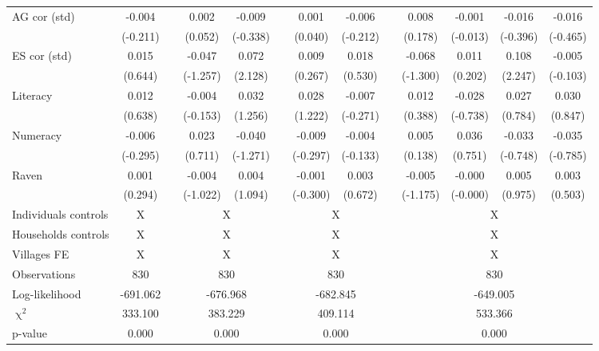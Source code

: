 \begin{table}[htbp]
{\begin{tabular}{lcccccccccccc}
    AG cor (std) & -0.004 &       & 0.002 & -0.009 &       & 0.001 & -0.006 &       & 0.008 & -0.001 & -0.016 & -0.016 \\
          & (-0.211) &       & (0.052) & (-0.338) &       & (0.040) & (-0.212) &       & (0.178) & (-0.013) & (-0.396) & (-0.465) \\
    ES cor (std) & 0.015 &       & -0.047 & 0.072 &       & 0.009 & 0.018 &       & -0.068 & 0.011 & 0.108 & -0.005 \\
          & (0.644) &       & (-1.257) & (2.128) &       & (0.267) & (0.530) &       & (-1.300) & (0.202) & (2.247) & (-0.103) \\
    Literacy & 0.012 &       & -0.004 & 0.032 &       & 0.028 & -0.007 &       & 0.012 & -0.028 & 0.027 & 0.030 \\
          & (0.638) &       & (-0.153) & (1.256) &       & (1.222) & (-0.271) &       & (0.388) & (-0.738) & (0.784) & (0.847) \\
    Numeracy & -0.006 &       & 0.023 & -0.040 &       & -0.009 & -0.004 &       & 0.005 & 0.036 & -0.033 & -0.035 \\
          & (-0.295) &       & (0.711) & (-1.271) &       & (-0.297) & (-0.133) &       & (0.138) & (0.751) & (-0.748) & (-0.785) \\
    Raven & 0.001 &       & -0.004 & 0.004 &       & -0.001 & 0.003 &       & -0.005 & -0.000 & 0.005 & 0.003 \\
          & (0.294) &       & (-1.022) & (1.094) &       & (-0.300) & (0.672) &       & (-1.175) & (-0.000) & (0.975) & (0.503) \\
    \midrule
    Individuals controls & \multicolumn{1}{c}{X} &       & \multicolumn{2}{c}{X} &       & \multicolumn{2}{c}{X} &       & \multicolumn{4}{c}{X} \\
    Households controls & \multicolumn{1}{c}{X} &       & \multicolumn{2}{c}{X} &       & \multicolumn{2}{c}{X} &       & \multicolumn{4}{c}{X} \\
    Villages FE & \multicolumn{1}{c}{X} &       & \multicolumn{2}{c}{X} &       & \multicolumn{2}{c}{X} &       & \multicolumn{4}{c}{X} \\
    \midrule
    Observations & 830   &       & \multicolumn{2}{c}{830} &       & \multicolumn{2}{c}{830} &       & \multicolumn{4}{c}{830} \\
    Log-likelihood & -691.062 &       & \multicolumn{2}{c}{-676.968} &       & \multicolumn{2}{c}{-682.845} &       & \multicolumn{4}{c}{-649.005} \\
    $\upchi^2$ & 333.100 &       & \multicolumn{2}{c}{383.229} &       & \multicolumn{2}{c}{409.114} &       & \multicolumn{4}{c}{533.366} \\
    p-value & 0.000 &       & \multicolumn{2}{c}{0.000} &       & \multicolumn{2}{c}{0.000} &       & \multicolumn{4}{c}{0.000} \\
    \bottomrule
    \end{tabular}%
    }
  \label{tab:ame_debtpath_b5}%
\end{table}%

